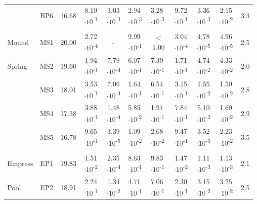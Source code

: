 {\begin{landscape}
\begin{table}
\begin{adjustbox}{width=600pt,keepaspectratio}
\begin{threeparttable}
\begin{tabular}{lccccllcccc}
      & BP6   & 16.68 & 8.10$\cdot 10$\textsuperscript{-1} & 3.03$\cdot 10$\textsuperscript{-3} & 2.94$\cdot 10$\textsuperscript{-3} & 3.28$\cdot 10$\textsuperscript{-3} & 9.72$\cdot 10$\textsuperscript{-1} & 3.36$\cdot 10$\textsuperscript{-3} & 2.15$\cdot 10$\textsuperscript{-2} & 3.3 \\
      &       &       &       &       &       &       &       &       &       &  \\
Mound & MS1   & 20.00 & 2.72$\cdot 10$\textsuperscript{-4} & -     & 9.99$\cdot 10$\textsuperscript{-1} & \multicolumn{1}{c}{$<$ 1.00} & 3.04$\cdot 10$\textsuperscript{-4} & 4.78$\cdot 10$\textsuperscript{-5} & 4.96$\cdot 10$\textsuperscript{-5} & 2.5 \\
Spring & MS2   & 19.60 & 1.94$\cdot 10$\textsuperscript{-1} & 7.79$\cdot 10$\textsuperscript{-4} & 6.07$\cdot 10$\textsuperscript{-1} & 7.39$\cdot 10$\textsuperscript{-1} & 1.71$\cdot 10$\textsuperscript{-1} & 4.74$\cdot 10$\textsuperscript{-2} & 4.33$\cdot 10$\textsuperscript{-2} & 2.0 \\
      & MS3   & 18.01 & 3.53$\cdot 10$\textsuperscript{-1} & 7.06$\cdot 10$\textsuperscript{-4} & 1.64$\cdot 10$\textsuperscript{-1} & 6.54$\cdot 10$\textsuperscript{-1} & 3.15$\cdot 10$\textsuperscript{-1} & 1.55$\cdot 10$\textsuperscript{-2} & 1.50$\cdot 10$\textsuperscript{-2} & 2.8 \\
      & MS4   & 17.38 & 3.88$\cdot 10$\textsuperscript{-1} & 1.48$\cdot 10$\textsuperscript{-4} & 5.85$\cdot 10$\textsuperscript{-2} & 1.94$\cdot 10$\textsuperscript{-1} & 7.84$\cdot 10$\textsuperscript{-1} & 5.10$\cdot 10$\textsuperscript{-3} & 1.69$\cdot 10$\textsuperscript{-2} & 2.9 \\
      & MS5   & 16.78 & 9.65$\cdot 10$\textsuperscript{-1} & 3.39$\cdot 10$\textsuperscript{-5} & 1.09$\cdot 10$\textsuperscript{-2} & 2.68$\cdot 10$\textsuperscript{-2} & 9.47$\cdot 10$\textsuperscript{-1} & 3.52$\cdot 10$\textsuperscript{-3} & 2.23$\cdot 10$\textsuperscript{-2} & 3.5 \\
      &       &       &       &       &       &       &       &       &       &  \\
Empress & EP1   & 19.83 & 1.51$\cdot 10$\textsuperscript{-2} & 2.35$\cdot 10$\textsuperscript{-4} & 8.63$\cdot 10$\textsuperscript{-1} & 9.83$\cdot 10$\textsuperscript{-1} & 1.47$\cdot 10$\textsuperscript{-2} & 1.11$\cdot 10$\textsuperscript{-3} & 1.13$\cdot 10$\textsuperscript{-3} & 2.1 \\
Pool  & EP2   & 18.91 & 2.24$\cdot 10$\textsuperscript{-1} & 1.34$\cdot 10$\textsuperscript{-2} & 4.71$\cdot 10$\textsuperscript{-1} & 7.06$\cdot 10$\textsuperscript{-1} & 2.30$\cdot 10$\textsuperscript{-1} & 3.15$\cdot 10$\textsuperscript{-2} & 3.25$\cdot 10$\textsuperscript{-2} & 2.5 \\

\end{tabular}
\end{threeparttable}
\end{adjustbox}
\end{table}
\end{landscape}}
